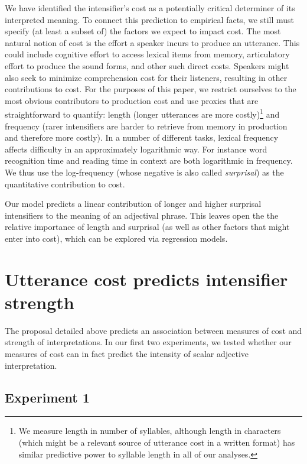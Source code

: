\documentclass[10pt,letterpaper]{article}
\begin{document}
We have identified the intensifier's cost as a potentially critical determiner of its interpreted meaning. To connect this prediction to empirical facts, we still must specify (at least a subset of) the factors we expect to impact cost.
The most natural notion of cost is the effort a speaker incurs to produce an utterance. This could include cognitive effort to access lexical items from memory, articulatory effort to produce 
the sound forms, and other such direct costs.
Speakers might also seek to minimize comprehension cost for their listeners, resulting in other contributions to cost. 
For the purposes of this paper, we restrict ourselves to the most
obvious contributors to production cost and use proxies that are straightforward to quantify: length (longer utterances are more costly)\footnote{
  We measure length in number of syllables, although length in characters (which might be a relevant source of utterance cost in a written format) has similar predictive power to syllable length in all of our analyses.
}
and frequency (rarer intensifiers are harder to retrieve from memory in production and therefore more costly).
In a number of different tasks, lexical frequency affects difficulty in an approximately logarithmic way. For instance word recognition time \cite{McCusker1977} 
and reading time in context \cite{smithLevy} are both logarithmic in frequency. We thus use the log-frequency (whose negative is also called \emph{surprisal}) as the quantitative contribution to cost.

Our model predicts a linear contribution of longer and higher surprisal intensifiers to the meaning of an adjectival phrase. 
This leaves open the the relative importance of length and surprisal (as well as other factors that might enter into cost), which can be explored via regression models.

\section{Utterance cost predicts intensifier strength}
The proposal detailed above predicts an association between measures of cost and strength of interpretations. 
In our first two experiments, we tested whether our measures of cost can in fact predict the intensity of scalar adjective interpretation.

\subsection{Experiment 1}
\end{document}
